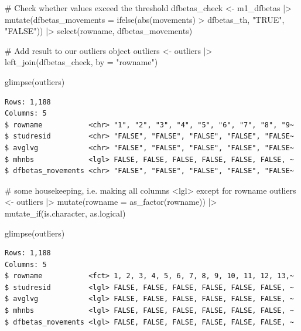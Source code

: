 \documentclass[
  letterpaper,
]{krantz}
\makeatletter
\newenvironment{Shaded}{\begin{snugshade}}{\end{snugshade}}
\newcommand{\AttributeTok}[1]{\textcolor[rgb]{0.40,0.45,0.13}{#1}}
\newcommand{\CommentTok}[1]{\textcolor[rgb]{0.37,0.37,0.37}{#1}}
\newcommand{\FunctionTok}[1]{\textcolor[rgb]{0.28,0.35,0.67}{#1}}
\newcommand{\NormalTok}[1]{\textcolor[rgb]{0.00,0.23,0.31}{#1}}
\newcommand{\OtherTok}[1]{\textcolor[rgb]{0.00,0.23,0.31}{#1}}
\newcommand{\SpecialCharTok}[1]{\textcolor[rgb]{0.37,0.37,0.37}{#1}}
\newcommand{\StringTok}[1]{\textcolor[rgb]{0.13,0.47,0.30}{#1}}
\newenvironment{kframe}{%
\medskip{}
\setlength{\fboxsep}{.8em}
 \def\at@end@of@kframe{}%
 \ifinner\ifhmode%
  \def\at@end@of@kframe{\end{minipage}}%
  \begin{minipage}{\columnwidth}%
 \fi\fi%
 \def\FrameCommand##1{\hskip\@totalleftmargin \hskip-\fboxsep
 \colorbox{shadecolor}{##1}\hskip-\fboxsep
     \hskip-\linewidth \hskip-\@totalleftmargin \hskip\columnwidth}%
 \MakeFramed {\advance\hsize-\width
   \@totalleftmargin\z@ \linewidth\hsize
   \@setminipage}}%
 {\par\unskip\endMakeFramed%
 \at@end@of@kframe}
\renewenvironment{Shaded}{\begin{kframe}}{\end{kframe}}
\makeatother
\begin{document}
\begin{Shaded}
\begin{Highlighting}[]
\CommentTok{\# Check whether values exceed the threshold}
\NormalTok{dfbetas\_check }\OtherTok{\textless{}{-}}
\NormalTok{  m1\_dfbetas }\SpecialCharTok{|\textgreater{}}
  \FunctionTok{mutate}\NormalTok{(}\AttributeTok{dfbetas\_movements =} \FunctionTok{ifelse}\NormalTok{(}\FunctionTok{abs}\NormalTok{(movements) }\SpecialCharTok{\textgreater{}}\NormalTok{ dfbetas\_th,}
                                \StringTok{"TRUE"}\NormalTok{,}
                                \StringTok{"FALSE"}\NormalTok{)) }\SpecialCharTok{|\textgreater{}}
  \FunctionTok{select}\NormalTok{(rowname, dfbetas\_movements)}

\CommentTok{\# Add result to our outliers object}
\NormalTok{outliers }\OtherTok{\textless{}{-}}
\NormalTok{  outliers }\SpecialCharTok{|\textgreater{}}
  \FunctionTok{left\_join}\NormalTok{(dfbetas\_check, }\AttributeTok{by =} \StringTok{"rowname"}\NormalTok{)}

\FunctionTok{glimpse}\NormalTok{(outliers)}
\end{Highlighting}
\end{Shaded}

\begin{verbatim}
Rows: 1,188
Columns: 5
$ rowname           <chr> "1", "2", "3", "4", "5", "6", "7", "8", "9~
$ studresid         <chr> "FALSE", "FALSE", "FALSE", "FALSE", "FALSE~
$ avglvg            <chr> "FALSE", "FALSE", "FALSE", "FALSE", "FALSE~
$ mhnbs             <lgl> FALSE, FALSE, FALSE, FALSE, FALSE, FALSE, ~
$ dfbetas_movements <chr> "FALSE", "FALSE", "FALSE", "FALSE", "FALSE~
\end{verbatim}

\begin{Shaded}
\begin{Highlighting}[]
\CommentTok{\# some housekeeping, i.e. making all columns \textless{}lgl\textgreater{} except for rowname}
\NormalTok{outliers }\OtherTok{\textless{}{-}}
\NormalTok{  outliers }\SpecialCharTok{|\textgreater{}}
  \FunctionTok{mutate}\NormalTok{(}\AttributeTok{rowname =} \FunctionTok{as\_factor}\NormalTok{(rowname)) }\SpecialCharTok{|\textgreater{}}
  \FunctionTok{mutate\_if}\NormalTok{(is.character, as.logical)}

\FunctionTok{glimpse}\NormalTok{(outliers)}
\end{Highlighting}
\end{Shaded}

\begin{verbatim}
Rows: 1,188
Columns: 5
$ rowname           <fct> 1, 2, 3, 4, 5, 6, 7, 8, 9, 10, 11, 12, 13,~
$ studresid         <lgl> FALSE, FALSE, FALSE, FALSE, FALSE, FALSE, ~
$ avglvg            <lgl> FALSE, FALSE, FALSE, FALSE, FALSE, FALSE, ~
$ mhnbs             <lgl> FALSE, FALSE, FALSE, FALSE, FALSE, FALSE, ~
$ dfbetas_movements <lgl> FALSE, FALSE, FALSE, FALSE, FALSE, FALSE, ~
\end{verbatim}
\end{document}
